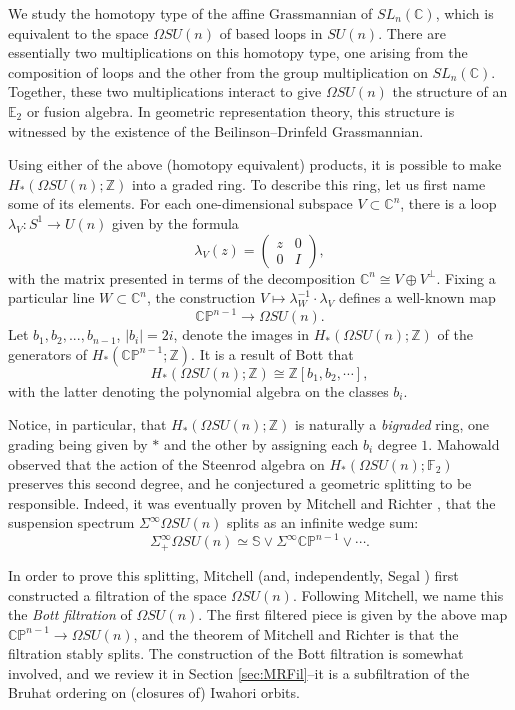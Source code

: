 We study the homotopy type of the affine Grassmannian of $SL_n(\mathbb{C})$, which is equivalent to the space $\Omega SU(n)$ of based loops in $SU(n)$.  There are essentially two multiplications on this homotopy type, one arising from the composition of loops and the other from the group multiplication on $SL_n(\mathbb{C})$.  Together, these two multiplications interact to give $\Omega SU(n)$ the structure of an $\mathbb{E}_2$ or fusion algebra.  In geometric representation theory, this structure is witnessed by the existence of the Beilinson--Drinfeld Grassmannian.

Using either of the above (homotopy equivalent) products, it is possible to make $H_*(\Omega SU(n);\mathbb{Z})$ into a graded ring.  To describe this ring, let us first name some of its elements.  For each one-dimensional subspace $V \subset \mathbb{C}^n$, there is a loop $\lambda_V:S^1 \rightarrow U(n)$ given by the formula
$$\lambda_V(z)=\left( \begin{array}{cc} z & 0 \\ 0 & I \end{array} \right),$$
with the matrix presented in terms of the decomposition $\mathbb{C}^n \cong V \oplus V^{\perp}$.  Fixing a particular line $W \subset \mathbb{C}^n$, the construction $V \mapsto \lambda_W^{-1} \cdot \lambda_V$ defines a well-known map
$$\mathbb{CP}^{n-1} \rightarrow \Omega SU(n).$$
Let $b_1,b_2,...,b_{n-1}$, $|b_i|=2i$, denote the images in $H_*(\Omega SU(n);\mathbb{Z})$ of the generators of $H_*(\mathbb{CP}^{n-1};\mathbb{Z})$.  It is a result of Bott \cite{Bott} that
$$H_*(\Omega SU(n);\mathbb{Z}) \cong \mathbb{Z}[b_1,b_2,\cdots],$$
with the latter denoting the polynomial algebra on the classes $b_i$.

Notice, in particular, that $H_*(\Omega SU(n);\mathbb{Z})$ is naturally a \textit{bigraded} ring, one grading being given by $*$ and the other by assigning each $b_i$ degree $1$.  Mahowald observed that the action of the Steenrod algebra on $H_*(\Omega SU(n);\mathbb{F}_2)$ preserves this second degree, and he conjectured a geometric splitting to be responsible.  Indeed, it was eventually proven by Mitchell and Richter \cite[Theorem 2.1]{CrabbMitchell}, that the suspension spectrum $\Sigma^{\infty} \Omega SU(n)$ splits as an infinite wedge sum:
$$\Sigma^{\infty}_+ \Omega SU(n) \simeq \mathbb{S} \vee \Sigma^{\infty} \mathbb{CP}^{n-1} \vee \cdots.$$

In order to prove this splitting, Mitchell \cite{MitchellSU(n)} (and, independently, Segal \cite{Segal}) first constructed a filtration of the space $\Omega SU(n)$.  Following Mitchell, we name this the \textit{Bott filtration} of $\Omega SU(n)$.  The first filtered piece is given by the above map $\mathbb{CP}^{n-1} \rightarrow \Omega SU(n)$, and the theorem of Mitchell and Richter is that the filtration stably splits.  The construction of the Bott filtration is somewhat involved, and we review it in Section \ref{sec:MRFil}--it is a subfiltration of the Bruhat ordering on (closures of) Iwahori orbits.

